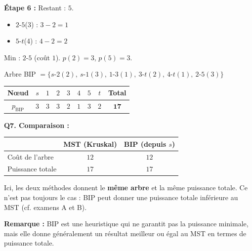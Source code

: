 \documentclass[12pt,a4paper]{article}
\begin{document}
\begin{correction}
\textbf{\'Etape 6 :} Restant : $5$.
\begin{itemize}[nosep]
    \item $2$-$5$(3) : $3-2=1$
    \item $5$-$t$(4) : $4-2=2$
\end{itemize}
Min : $2$-$5$ (co\^ut $1$). $p(2)=3$, $p(5)=3$.

\medskip
Arbre BIP $= \{s\text{-}2(2),\ s\text{-}1(3),\ 1\text{-}3(1),\ 3\text{-}t(2),\ 4\text{-}t(1),\ 2\text{-}5(3)\}$

\begin{center}
\renewcommand{\arraystretch}{1.2}
\begin{tabular}{|c|c|c|c|c|c|c|c||c|}
\hline
\textbf{N\oe ud} & $s$ & $1$ & $2$ & $3$ & $4$ & $5$ & $t$ & \textbf{Total} \\\hline
$p_{\text{BIP}}$ & $3$ & $3$ & $3$ & $2$ & $1$ & $3$ & $2$ & $\mathbf{17}$ \\\hline
\end{tabular}
\end{center}

\medskip
\textbf{Q7. Comparaison :}

\begin{center}
\begin{tabular}{|l|c|c|}
\hline
& \textbf{MST (Kruskal)} & \textbf{BIP (depuis $s$)} \\\hline
Co\^ut de l'arbre & $12$ & $12$ \\\hline
Puissance totale & $17$ & $17$ \\\hline
\end{tabular}
\end{center}

Ici, les deux m\'ethodes donnent le \textbf{m\^eme arbre} et la m\^eme puissance totale. Ce n'est pas toujours le cas : BIP peut donner une puissance totale inf\'erieure au MST (cf. examens A et B).

\textbf{Remarque :} BIP est une heuristique qui ne garantit pas la puissance minimale, mais elle donne g\'en\'eralement un r\'esultat meilleur ou \'egal au MST en termes de puissance totale.
\end{correction}
\end{document}
